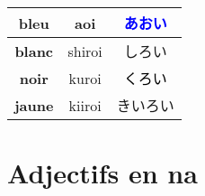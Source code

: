 \documentclass[11pt]{report}
\newenvironment{Japanese}{%
\CJKfamily{min}%
\CJKtilde  
\CJKnospace}{}
\begin{document}
\begin{CJK}{UTF8}{}
\begin{Japanese}
\begin{center}
\begin{tabular}{|c|c|c|}
			\hline
			\textbf{bleu} & aoi & \textcolor{blue}{あおい} \\
			\hline
			\textbf{blanc} & shiroi & \textcolor[rgb]{0.75,0.75,0.75}{しろい} \\
			\hline
			\textbf{noir} & kuroi & \textcolor{black}{くろい} \\
			\hline
			\textbf{jaune} & kiiroi & \textcolor[rgb]{0.9,0.8,0}{きいろい} \\
			\hline
		\end{tabular}
	\end{center}
\end{Japanese}  
\end{CJK}

\chapter{Adjectifs en na}
\end{document}
